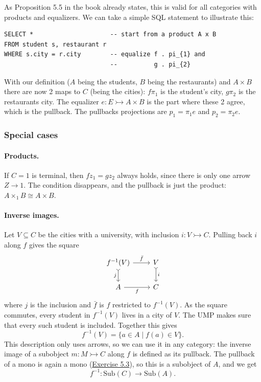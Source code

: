 \documentclass[11pt]{article}
\newcommand{\exref}[1]{\hyperref[ex:#1]{Exercise #1}}
\begin{document}
As Proposition 5.5 in the book already states, this is valid for all categories
with products and equalizers. We can take a simple SQL statement to illustrate
this:
\begin{verbatim}
SELECT *                     -- start from a product A x B
FROM student s, restaurant r
WHERE s.city = r.city        -- equalize f . pi_{1} and
                             --          g . pi_{2}
\end{verbatim}
With our definition ($A$ being the students, $B$ being the restaurants) and $A
\times B$ there are now 2 maps to $C$ (being the cities): $f \pi_{1}$ is the
student's city, $g \pi_{2}$ is the restaurants city. The equalizer $e: E
\rightarrowtail A \times B$ is the part where these 2 agree, which is the
pullback. The pullbacks projections are $p_{1} = \pi_{1} e$ and $p_{2} =
\pi_{2} e$.

\subsubsection{Special cases}

\paragraph{Products.} If $C = 1$ is terminal, then $fz_{1} = gz_{2}$ always
holds, since there is only one arrow $Z \rightarrow 1$. The condition
disappears, and the pullback is just the product: $A \times_{1} B \cong A \times
B$.

\paragraph{Inverse images.} Let $V \subseteq C$ be the cities with a
university, with inclusion $i: V \rightarrowtail C$. Pulling back $i$ along $f$
gives the square
\[
\begin{tikzcd}
  f^{-1}(V) \ar[r, "\bar{f}"] \ar[d, tail, "j"'] & V \ar[d, tail, "i"] \\
  A \ar[r, "f"'] & C
\end{tikzcd}
\]
where $j$ is the inclusion and $\bar{f}$ is $f$ restricted to $f^{-1}(V)$. As
the square commutes, every student in $f^{-1}(V)$ lives in a city of $V$. The
UMP makes sure that every such student is included. Together this gives
\[
  f^{-1}(V) = \{ a \in A \mid f(a) \in V \}.
\]
This description only uses arrows, so we can use it in any category: the
inverse image of a subobject $m: M \rightarrowtail C$ along $f$ is defined as
its pullback. The pullback of a mono is again a mono (\exref{5.3}), so this
is a subobject of $A$, and we get
\[
  f^{-1}: \text{Sub}(C) \rightarrow \text{Sub}(A).
\]
\end{document}
